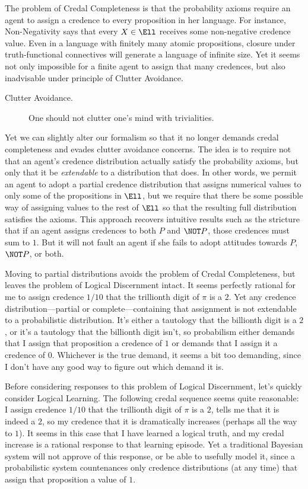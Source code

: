 The problem of Credal Completeness is that the probability axioms require an agent to assign a credence to every proposition in her language. For instance, Non-Negativity says that every $X \in \Ell$ receives some non-negative credence value. Even in a language with finitely many atomic propositions, closure under truth-functional connectives will generate a language of infinite size. Yet it seems not only impossible for a finite agent to assign that many credences, but also inadvisable under  principle of Clutter Avoidance.
\begin{description}
\item[Clutter Avoidance.\,]{One should not clutter one's mind with trivialities.} 
\end{description}
Yet we can slightly alter our formalism so that it no longer demands credal completeness and evades clutter avoidance concerns. The idea is to require not that an agent's credence distribution actually satisfy the probability axioms, but only that it be \emph{extendable} to a distribution that does. In other words, we permit an agent to adopt a partial credence distribution that assigns numerical values to only some of the propositions in $\Ell$, but we require that there be some possible way of assigning values to the rest of $\Ell$ so that the resulting full distribution satisfies the axioms. This approach recovers intuitive results such as the stricture that if an agent assigns credences to both $P$ and $\NOT P$, those credences must sum to $1$. But it will not fault an agent if she fails to adopt attitudes towards $P$, $\NOT P$, or both.

Moving to partial distributions avoids the problem of Credal Completeness, but leaves the problem of Logical Discernment intact. It seems perfectly rational for me to assign credence $1/10$ that the trillionth digit of $\pi$ is a $2$. Yet any credence distribution---partial or complete---containing that assignment is not extendable to a probabilistic distribution. It's either a tautology that the billionth digit is a $2$, or it's a tautology that the billionth digit isn't, so probabilism either demands that I assign that proposition a credence of $1$ or demands that I assign it a credence of $0$. Whichever is the true demand, it seems a bit too demanding, since I don't have any good way to figure out which demand it is.

Before considering responses to this problem of Logical Discernment, let's quickly consider Logical Learning. The following credal sequence seems quite reasonable: I assign credence $1/10$ that the trillionth digit of $\pi$ is a $2$, \citet{TalbottTwoPrinciples} tells me that it is indeed a $2$, so my credence that it is dramatically increases (perhaps all the way to $1$). It seems in this case that I have learned a logical truth, and my credal increase is a rational response to that learning episode. Yet a traditional Bayesian system will not approve of this response, or be able to usefully model it, since a probabilistic system countenances only credence distributions (at any time) that assign that proposition a value of $1$.

